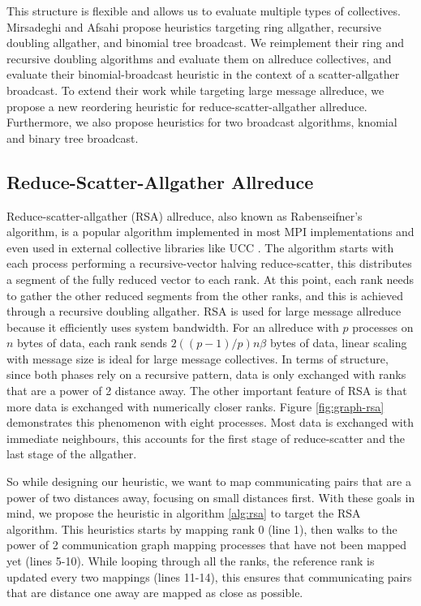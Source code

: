 This structure is flexible and allows us to evaluate multiple types of collectives.
Mirsadeghi and Afsahi \cite{Mirsadeghi2016TopoAwareCollRR} propose heuristics targeting ring allgather, recursive doubling allgather, and binomial tree broadcast. 
We reimplement their ring and recursive doubling algorithms and evaluate them on allreduce collectives, and evaluate their binomial-broadcast heuristic in the context of a scatter-allgather broadcast.
To extend their work while targeting large message allreduce, we propose a new reordering heuristic for reduce-scatter-allgather allreduce.
Furthermore, we also propose heuristics for two broadcast algorithms, knomial and binary tree broadcast.



\subsection{Reduce-Scatter-Allgather Allreduce}
Reduce-scatter-allgather (RSA) allreduce, also known as Rabenseifner's algorithm, is a popular algorithm implemented in most MPI implementations and even used in external collective libraries like UCC \cite{UCC}.
The algorithm starts with each process performing a recursive-vector halving reduce-scatter, this distributes a segment of the fully reduced vector to each rank.
At this point, each rank needs to gather the other reduced segments from the other ranks, and this is achieved through a recursive doubling allgather.
RSA is used for large message allreduce because it efficiently uses system bandwidth.
For an allreduce with $p$ processes on $n$ bytes of data, each rank sends $2((p-1)/p)n\beta$ bytes of data, linear scaling with message size is ideal for large message collectives.
In terms of structure, since both phases rely on a recursive pattern, data is only exchanged with ranks that are a power of 2 distance away.
The other important feature of RSA is that more data is exchanged with numerically closer ranks.
Figure \ref{fig:graph-rsa} demonstrates this phenomenon with eight processes.
Most data is exchanged with immediate neighbours, this accounts for the first stage of reduce-scatter and the last stage of the allgather.

So while designing our heuristic, we want to map communicating pairs that are a power of two distances away, focusing on small distances first.
With these goals in mind, we propose the heuristic in algorithm \ref{alg:rsa} to target the RSA algorithm.
This heuristics starts by mapping rank 0 (line 1), then walks to the power of 2 communication graph mapping processes that have not been mapped yet (lines 5-10). 
While looping through all the ranks, the reference rank is updated every two mappings (lines 11-14), this ensures that communicating pairs that are distance one away are mapped as close as possible. 

